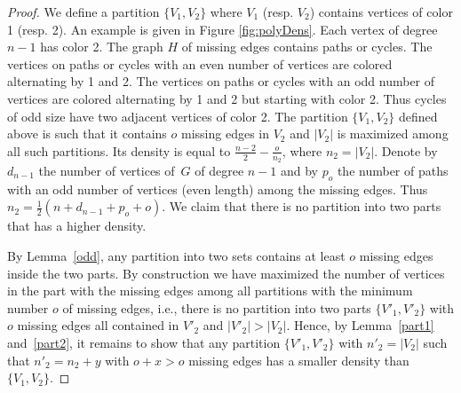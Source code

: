 \documentclass[a4paper,USenglish,cleveref, autoref]{lipics-v2021}
\begin{document}
 \begin{proof} We define a partition $\{V_1,V_2\}$ where $V_1$ (resp. $V_2$) contains vertices of color 1 (resp. 2). An example is given in Figure \ref{fig:polyDens}.
 Each vertex of degree $n-1$ has color 2. The graph $H$ of missing edges contains paths or cycles. The vertices on paths or cycles with an even number of vertices are colored alternating by 1 and 2. The vertices on paths or cycles with an odd number of vertices are colored alternating by 1 and 2 but starting with color 2. Thus cycles of odd size have two adjacent vertices of color 2.  The partition $\{V_1,V_2\}$ defined above is such that it contains $o$ missing edges in $V_2$ and $|V_2|$ is maximized among all such partitions.  
 Its density is equal to   $\frac{n-2}{2}- \frac{o}{n_2}$, where $n_2=|V_2|$. Denote by $d_{n-1}$ the number of vertices of~$G$ of degree $n-1$ and by $p_o$ the number of paths with an odd number of vertices (even length) among the missing edges. Thus $n_2=\frac12({n+d_{n-1}+p_o+o})$. We claim that there is no partition into two parts that has a higher density. 
 
 By Lemma~\ref{odd}, any partition into two sets contains at least $o$ missing edges inside the two parts. By construction we have maximized the number of vertices in the part with the missing edges among all partitions with the minimum number $o$ of missing edges, i.e., there is no partition into two parts  $\{V'_1,V'_2\}$ with $o$ missing edges all contained in $V'_2$ and $|V'_2|>|V_2|$. Hence, by Lemma~\ref{part1} and~\ref{part2}, it remains to show that any partition $\{V'_1,V'_2\}$ with $n'_2=|V_2|$ such that $n'_2=n_2+y$ with $o+x>o$ missing edges has a smaller density than  $\{V_1,V_2\}$.
 

\end{proof}
\end{document}
